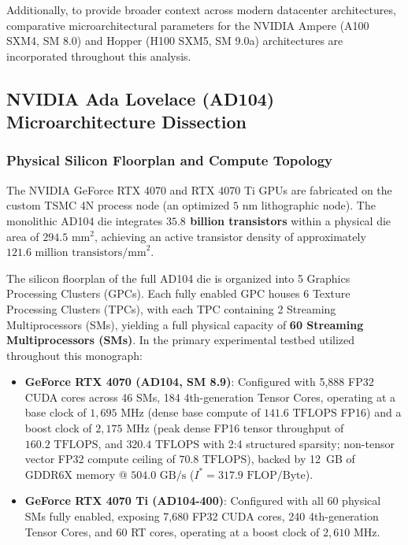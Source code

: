 Additionally, to provide broader context across modern datacenter architectures, comparative microarchitectural parameters for the NVIDIA Ampere (A100 SXM4, SM 8.0) and Hopper (H100 SXM5, SM 9.0a) architectures are incorporated throughout this analysis.

\subsection{NVIDIA Ada Lovelace (AD104) Microarchitecture Dissection}
\label{sec:appendix_nvidia_ada_dissection}

\subsubsection{Physical Silicon Floorplan and Compute Topology}
\label{sec:appendix_ada_floorplan}

The NVIDIA GeForce RTX 4070 and RTX 4070 Ti GPUs are fabricated on the custom TSMC 4N process node (an optimized $5\text{ nm}$ lithographic node). The monolithic AD104 die integrates \textbf{$35.8$ billion transistors} within a physical die area of \textbf{$294.5\text{ mm}^2$}, achieving an active transistor density of approximately $121.6\text{ million transistors/mm}^2$.

The silicon floorplan of the full AD104 die is organized into 5 Graphics Processing Clusters (GPCs). Each fully enabled GPC houses 6 Texture Processing Clusters (TPCs), with each TPC containing 2 Streaming Multiprocessors (SMs), yielding a full physical capacity of \textbf{60 Streaming Multiprocessors (SMs)}. In the primary experimental testbed utilized throughout this monograph:
\begin{itemize}
    \item \textbf{GeForce RTX 4070 (AD104, SM 8.9)}: Configured with 5,888 FP32 CUDA cores across 46 SMs, 184 4th-generation Tensor Cores, operating at a base clock of $1,695\text{ MHz}$ (dense base compute of $141.6\text{ TFLOPS}$ FP16) and a boost clock of $2,175\text{ MHz}$ (peak dense FP16 tensor throughput of $160.2\text{ TFLOPS}$, and $320.4\text{ TFLOPS}$ with 2:4 structured sparsity; non-tensor vector FP32 compute ceiling of $70.8\text{ TFLOPS}$), backed by 12~GB of GDDR6X memory @ $504.0\text{ GB/s}$ ($I^* = 317.9\text{ FLOP/Byte}$).
    \item \textbf{GeForce RTX 4070 Ti (AD104-400)}: Configured with all 60 physical SMs fully enabled, exposing 7,680 FP32 CUDA cores, 240 4th-generation Tensor Cores, and 60 RT cores, operating at a boost clock of $2,610\text{ MHz}$.
\end{itemize}


